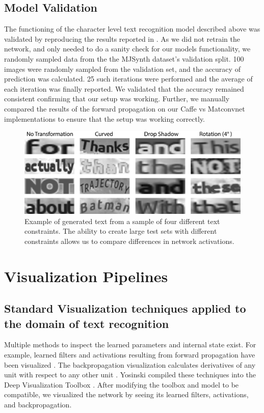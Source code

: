 \documentclass[10pt,twocolumn,letterpaper]{article}
\begin{document}
\subsection{Model Validation}
The functioning of the character level text recognition model described above was validated by reproducing the results reported in \cite{Jaderberg14c}. As we did not retrain the network, and only needed to do a sanity check for our models functionality, we randomly sampled data from the the MJSynth dataset's validation split. 100 images were randomly sampled from the validation set, and the accuracy of prediction was calculated. 25 such iterations were performed and the average of each iteration was finally reported. We validated that the accuracy remained consistent confirming that our setup was working. Further, we manually compared the results of the forward propagation on our Caffe vs Matconvnet implementations to ensure that the setup was working correctly.


\begin{figure}
\includegraphics[width=\columnwidth]{Figures/synthtext_outputs/synthext_outputs.png}
\caption{Example of generated text from a sample of four different text constraints. The ability to create large test sets with different constraints allows us to compare differences in network activations.}
\label{fig:genText}
\end{figure}


\section{Visualization Pipelines}


\subsection{Standard Visualization techniques applied to the domain of text recognition}
Multiple methods to inspect the learned parameters and internal state exist. For example, learned filters and activations resulting from forward propagation have been visualized \cite{yosinski2015understanding}. The backpropagation visualization calculates derivatives of any unit with respect to any other unit \cite{DBLP:journals/corr/ZeilerF13}. Yosinski compiled these techniques into the Deep Visualization Toolbox \cite{yosinski2015understanding}. After modifying the toolbox and model to be compatible, we visualized the network by seeing its learned filters, activations, and backpropagation.
\end{document}
